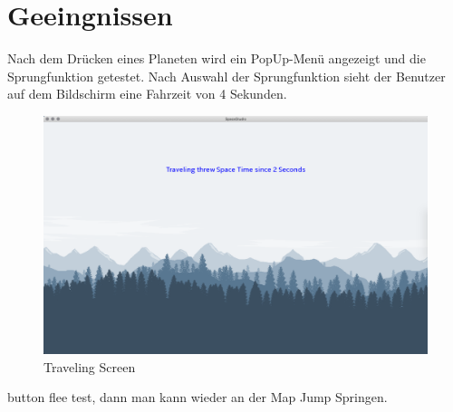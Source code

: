 \documentclass[12pt]{article}
\begin{document}
\section{Geeingnissen}
Nach dem Drücken eines Planeten wird ein PopUp-Menü angezeigt und die Sprungfunktion getestet.
Nach Auswahl der Sprungfunktion sieht der Benutzer auf dem Bildschirm eine Fahrzeit von 4 Sekunden.
\begin{figure}[htp]
\centering
\includegraphics[scale=0.3]{TestProtocolBilder/traveling.png}
\caption{Traveling Screen}
\end{figure}
button flee test, dann man kann wieder an der Map Jump Springen.
\newpage
\end{document}
